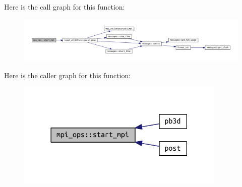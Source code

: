 Here is the call graph for this function\+:
\nopagebreak
\begin{figure}[H]
\begin{center}
\leavevmode
\includegraphics[width=350pt]{namespacempi__ops_a804ec65ff711509de1f8873f97bdf967_cgraph}
\end{center}
\end{figure}
Here is the caller graph for this function\+:
\nopagebreak
\begin{figure}[H]
\begin{center}
\leavevmode
\includegraphics[width=282pt]{namespacempi__ops_a804ec65ff711509de1f8873f97bdf967_icgraph}
\end{center}
\end{figure}
\mbox{\label{namespacempi__ops_abaf1ff6b3a25463476a767e196b4a73c}} 
